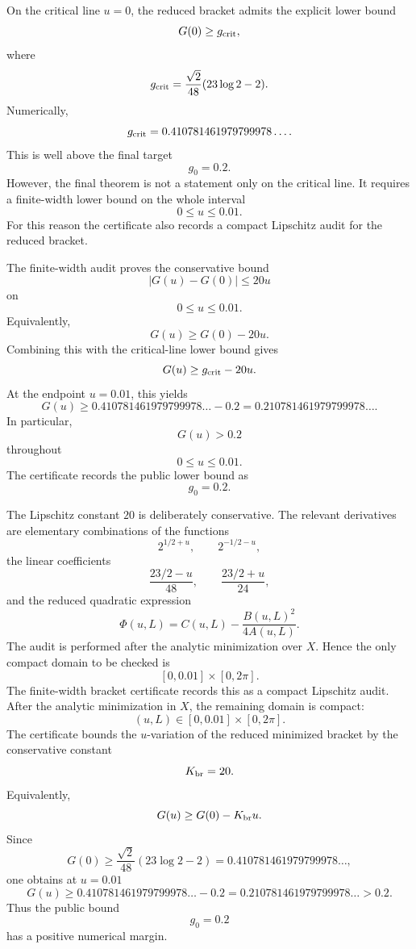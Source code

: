 \documentclass[11pt]{article}
\begin{document}
On the critical line \(u=0\), the reduced bracket admits the explicit lower
bound
\[
        G(0)
        \ge
        g_{\rm crit},
\]
where
\[
        g_{\rm crit}
        =
        \frac{\sqrt2}{48}(23\log2-2).
\]
Numerically,
\[
        g_{\rm crit}
        =
        0.410781461979799978\ldots .
\]
This is well above the final target
\[
        g_0=0.2.
\]
However, the final theorem is not a statement only on the critical line.  It
requires a finite-width lower bound on the whole interval
\[
        0\le u\le0.01.
\]
For this reason the certificate also records a compact Lipschitz audit for the
reduced bracket.

The finite-width audit proves the conservative bound
\[
        |G(u)-G(0)|
        \le
        20u
\]
on
\[
        0\le u\le0.01.
\]
Equivalently,
\[
        G(u)
        \ge
        G(0)-20u.
\]
Combining this with the critical-line lower bound gives
\[
        G(u)
        \ge
        g_{\rm crit}-20u.
\]
At the endpoint \(u=0.01\), this yields
\[
        G(u)
        \ge
        0.410781461979799978\ldots - 0.2
        =
        0.210781461979799978\ldots .
\]
In particular,
\[
        G(u)>0.2
\]
throughout
\[
        0\le u\le0.01.
\]
The certificate records the public lower bound as
\[
        g_0=0.2.
\]

The Lipschitz constant \(20\) is deliberately conservative.  The relevant
derivatives are elementary combinations of the functions
\[
        2^{1/2+u},
        \qquad
        2^{-1/2-u},
\]
the linear coefficients
\[
        \frac{23/2-u}{48},
        \qquad
        \frac{23/2+u}{24},
\]
and the reduced quadratic expression
\[
        \Phi(u,L)
        =
        C(u,L)-\frac{B(u,L)^2}{4A(u,L)}.
\]
The audit is performed after the analytic minimization over \(X\).  Hence the
only compact domain to be checked is
\[
        [0,0.01]\times[0,2\pi].
\]
The finite-width bracket certificate records this as a compact Lipschitz audit.
After the analytic minimization in \(X\), the remaining domain is compact:
\[
        (u,L)\in[0,0.01]\times[0,2\pi].
\]
The certificate bounds the \(u\)-variation of the reduced minimized bracket by
the conservative constant
\[
        K_{\rm br}=20.
\]
Equivalently,
\[
        G(u)\ge G(0)-K_{\rm br}u.
\]
Since
\[
        G(0)\ge
        \frac{\sqrt2}{48}(23\log2-2)
        =
        0.410781461979799978\ldots,
\]
one obtains at \(u=0.01\)
\[
        G(u)\ge
        0.410781461979799978\ldots-0.2
        =
        0.210781461979799978\ldots
        >
        0.2.
\]
Thus the public bound
\[
        g_0=0.2
\]
has a positive numerical margin.
\end{document}
